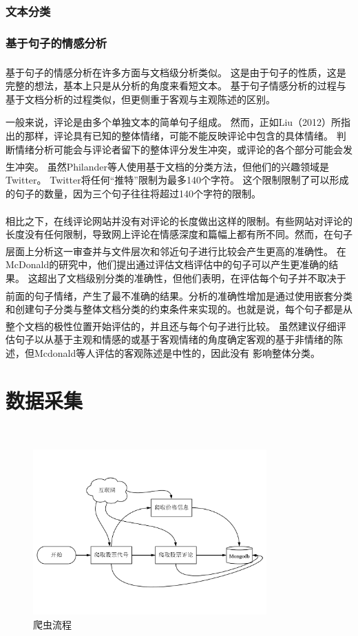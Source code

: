 \documentclass[cs4size,a4paper]{ctexart}
\numberwithin{equation}{section}
\numberwithin{table}{section}
\numberwithin{figure}{section}
\newcommand{\upcite}[1]{\textsuperscript{\textsuperscript{\cite{#1}}}}%
\begin{document}
\subsubsection{文本分类}



\subsubsection{基于句子的情感分析}

基于句子的情感分析在许多方面与文档级分析类似\upcite{liu2012sentiment}。 这是由于句子的性质，这是完整的想法，基本上只是从分析的角度来看短文本。 基于句子情感分析的过程与基于文档分析的过程类似，但更侧重于客观与主观陈述的区别。

一般来说，评论是由多个单独文本的简单句子组成。 然而，正如Liu（2012）所指出的那样，评论具有已知的整体情绪，可能不能反映评论中包含的具体情绪。 判断情绪分析可能会与评论者留下的整体评分发生冲突，或评论的各个部分可能会发生冲突。 虽然Philander等人\upcite{philander2016twitter}使用基于文档的分类方法，但他们的兴趣领域是Twitter。 Twitter将任何“推特”限制为最多140个字符。 这个限制限制了可以形成的句子的数量，因为三个句子往往将超过140个字符的限制。

相比之下，在线评论网站并没有对评论的长度做出这样的限制\upcite{sparks2011impact}。有些网站对评论的长度没有任何限制，导致网上评论在情感深度和篇幅上都有所不同。然而，在句子层面上分析这一审查并与文件层次和邻近句子进行比较会产生更高的准确性\upcite{mcdonald2007structured}。 在McDonald的研究中，他们提出通过评估文档评估中的句子可以产生更准确的结果。 这超出了文档级别分类的准确性，但他们表明，在评估每个句子并不取决于前面的句子情绪，产生了最不准确的结果\upcite{mcdonald2007structured}。分析的准确性增加是通过使用嵌套分类和创建句子分类与整体文档分类的约束条件来实现的。也就是说，每个句子都是从整个文档的极性位置开始评估的，并且还与每个句子进行比较。 虽然\upcite{liu2012sentiment}建议仔细评估句子以从基于主观和情感的或基于客观情绪的角度确定客观的基于非情绪的陈述，但Mcdonald等人评估的客观陈述是中性的，因此没有 影响整体分类。

\section{数据采集}~\label{数据采集}

\begin{figure}[thbp!]
  \centering
  \includegraphics[width=0.8\textwidth]{figure/spiderProcess.pdf}
  \caption{爬虫流程}\label{fig:spiderPrecess}
\end{figure}
\end{document}

